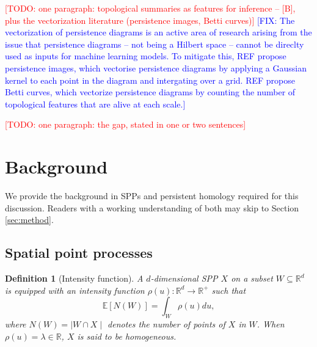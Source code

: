 \documentclass[11pt,letterpaper]{article}
\newcommand{\R}{\mathbb{R}}
\newcommand{\E}{\mathbb{E}}
\newcommand{\1}{\mathds{1}}
\newcommand{\todo}[1]{\textcolor{red}{[TODO: #1]}}
\newcommand{\fix}[1]{\textcolor{blue}{[FIX: #1]}}
\newcommand{\todo}[1]{}
\newcommand{\fix}[1]{}
\theoremstyle{plain}
\theoremstyle{definitioncolon}
\newtheorem{definition}[theorem]{Definition}
\begin{document}
\todo{one paragraph: topological summaries as features for inference -- [B],
plus the vectorization literature (persistence images, Betti curves)}
\fix{The vectorization of persistence diagrams is an active area of research arising from the issue
that persistence diagrams -- not being a Hilbert space -- cannot be direclty used as inputs for
machine learning models. To mitigate this, REF propose persistence images, which vectorise persistence
diagrams by applying a Gaussian kernel to each point in the diagram and intergating over a grid.
REF propose Betti curves, which vectorize persistence diagrams by counting the number of topological features
that are alive at each scale.}

\todo{one paragraph: the gap, stated in one or two sentences}


%
\section{Background}
\label{sec:background}

We provide the background in SPPs and persistent homology required for this
discussion. Readers with a working understanding of both may skip to
Section \ref{sec:method}.

\subsection{Spatial point processes}

    \begin{definition}[Intensity function]
        A $d$-dimensional SPP $X$ on a subset $W \subseteq \R^d$ is equipped
        with an intensity function $\rho(u): \R^d \rightarrow \R^+$ such that
            \[
            \E[N(W)] = \int_W \rho(u) du,
            \]
        where $N(W) = \mid W \cap X \mid$ denotes the number of points of $X$
        in $W$. When $\rho(u) = \lambda \in \R$, $X$ is said to be
        \emph{homogeneous}.
    \end{definition}
\end{document}
